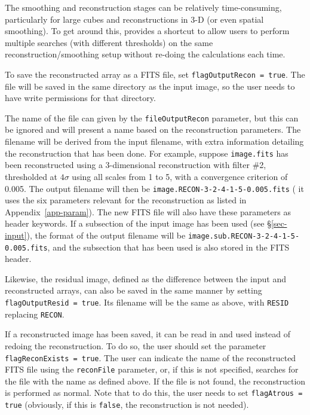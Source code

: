 \label{sec-reconIO}

The smoothing and reconstruction stages can be relatively
time-consuming, particularly for large cubes and reconstructions in
3-D (or even spatial smoothing). To get around this, \duchamp provides
a shortcut to allow users to perform multiple searches (\eg with
different thresholds) on the same reconstruction/smoothing setup
without re-doing the calculations each time.

To save the reconstructed array as a FITS file, set
\texttt{flagOutputRecon = true}. The file will be saved in the same
directory as the input image, so the user needs to have write
permissions for that directory.

The name of the file can given by the \texttt{fileOutputRecon}
parameter, but this can be ignored and \duchamp will present a name
based on the reconstruction parameters. The filename will be derived
from the input filename, with extra information detailing the
reconstruction that has been done. For example, suppose
\texttt{image.fits} has been reconstructed using a 3-dimensional
reconstruction with filter \#2, thresholded at $4\sigma$ using all
scales from 1 to 5, with a convergence criterion of 0.005. The output
filename will then be \texttt{image.RECON-3-2-4-1-5-0.005.fits} (\ie
it uses the six parameters relevant for the \atrous reconstruction as
listed in Appendix~\ref{app-param}). The new FITS file will also have
these parameters as header keywords. If a subsection of the input
image has been used (see \S\ref{sec-input}), the format of the output
filename will be \texttt{image.sub.RECON-3-2-4-1-5-0.005.fits}, and the
subsection that has been used is also stored in the FITS header.

Likewise, the residual image, defined as the difference between the
input and reconstructed arrays, can also be saved in the same manner
by setting \texttt{flagOutputResid = true}. Its filename will be the
same as above, with \texttt{RESID} replacing \texttt{RECON}.

If a reconstructed image has been saved, it can be read in and used
instead of redoing the reconstruction. To do so, the user should set
the parameter \texttt{flagReconExists = true}. The user can indicate
the name of the reconstructed FITS file using the \texttt{reconFile}
parameter, or, if this is not specified, \duchamp searches for the
file with the name as defined above. If the file is not found, the
reconstruction is performed as normal. Note that to do this, the user
needs to set \texttt{flagAtrous = true} (obviously, if this is
\texttt{false}, the reconstruction is not needed).

